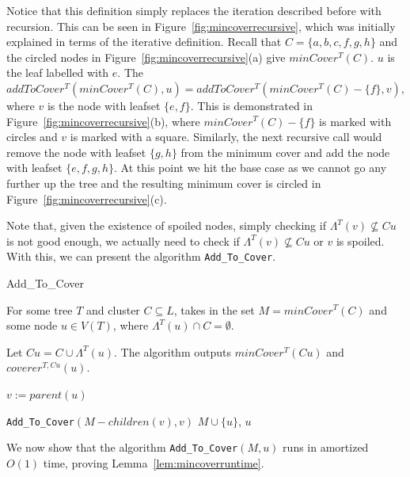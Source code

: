 \documentclass{article}
\newcommand{\leafset}{\Lambda}
\begin{document}
    Notice that this definition simply replaces the iteration described before with recursion. This can be seen in Figure~\ref{fig:mincoverrecursive}, which was initially explained in terms of the iterative definition. Recall that $C = \{a, b, c, f, g, h\}$ and the circled nodes in Figure~\ref{fig:mincoverrecursive}(a) give $minCover^{T}(C)$. $u$ is the leaf labelled with $e$. The $addToCover^{T}(minCover^{T}(C), u) = addToCover^{T}(minCover^{T}(C) - \{f\}, v)$, where $v$ is the node with leafset $\{e, f\}$. This is demonstrated in Figure~\ref{fig:mincoverrecursive}(b), where $minCover^{T}(C) - \{f\}$ is marked with circles and $v$ is marked with a square. Similarly, the next recursive call would remove the node with leafset $\{g, h\}$ from the minimum cover and add the node with leafset $\{e, f, g, h\}$. At this point we hit the base case as we cannot go any further up the tree and the resulting minimum cover is circled in Figure~\ref{fig:mincoverrecursive}(c).

    Note that, given the existence of spoiled nodes, simply checking if $\leafset^{T}(v) \not\subseteq Cu$ is not good enough, we actually need to check if $\leafset^{T}(v) \not\subseteq Cu$ or $v$ is spoiled. With this, we can present the algorithm \texttt{Add\_To\_Cover}.

    \begin{algorithm}
        \caption{Add\_To\_Cover}
        \label{alg:addtocover}

        \begin{algorithmic}[1]
            \Input For some tree $T$ and cluster $C \subseteq L$, takes in the set $M = minCover^{T}(C)$ and some node $u \in V(T)$, where $\leafset^{T}(u) \cap C = \emptyset$.

            \Output Let $Cu = C \cup \leafset^{T}(u)$. The algorithm outputs $minCover^{T}(Cu)$ and $coverer^{T, Cu}(u)$.

            \State $v := parent(u)$

            \If{$\leafset^{T}(v) \subseteq Cu$ and $v$ is not spoiled}
                \State \Return \texttt{Add\_To\_Cover}$(M - children(v), v)$
            \Else
                \State \Return $M \cup \{u\}$, $u$
            \EndIf
        \end{algorithmic}
    \end{algorithm}

    We now show that the algorithm \texttt{Add\_To\_Cover}$(M, u)$ runs in amortized $O(1)$ time, proving Lemma~\ref{lem:mincoverruntime}.
\end{document}
